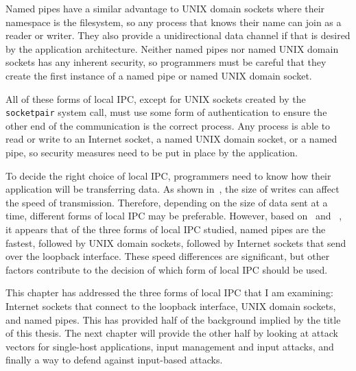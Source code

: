 Named pipes have a similar advantage to UNIX domain sockets where their namespace is the filesystem, so any process that knows their name can join as a reader or writer.  They also provide a unidirectional data channel if that is desired by the application architecture.  Neither named pipes nor named UNIX domain sockets has any inherent security, so programmers must be careful that they create the first instance of a named pipe or named UNIX domain socket.

All of these forms of local IPC, except for UNIX sockets created by the \texttt{socketpair} system call, must use some form of authentication to ensure the other end of the communication is the correct process.  Any process is able to read or write to an Internet socket, a named UNIX domain socket, or a named pipe, so security measures need to be put in place by the application.

To decide the right choice of local IPC, programmers need to know how their application will be transferring data.  As shown in~\cite{Xiurong2011TheAA}, the size of writes can affect the speed of transmission.  Therefore, depending on the size of data sent at a time, different forms of local IPC may be preferable.  However, based on~\cite{immich2003performance} and ~\cite{Stevens:1997:UNP:522800}, it appears that of the three forms of local IPC studied, named pipes are the fastest, followed by UNIX domain sockets, followed by Internet sockets that send over the loopback interface.  These speed differences are significant, but other factors contribute to the decision of which form of local IPC should be used.

This chapter has addressed the three forms of local IPC that I am examining: Internet sockets that connect to the loopback interface, UNIX domain sockets, and named pipes.  This has provided half of the background implied by the title of this thesis.  The next chapter will provide the other half by looking at attack vectors for single-host applications, input management and input attacks, and finally a way to defend against input-based attacks.
